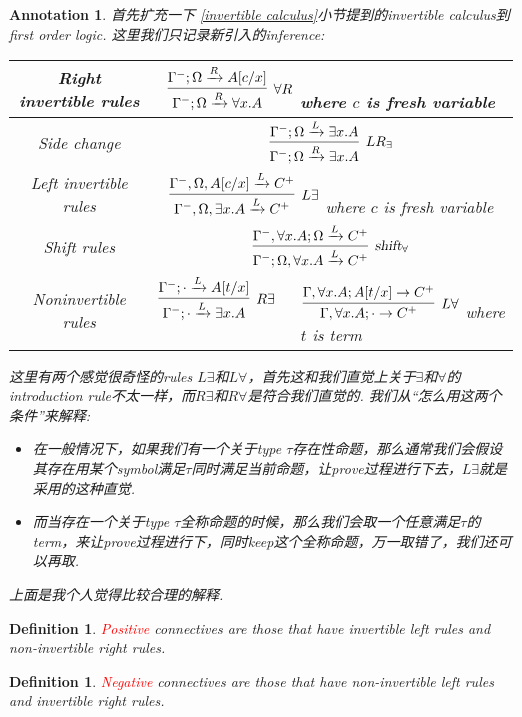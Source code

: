 \documentclass{article}
\theoremstyle{plain}
\newtheorem{definition}[theorem]{Definition}
\newtheorem{annotation}[theorem]{Annotation}
\theoremstyle{nonumberplain}
\newcommand{\redt}[1]{\textcolor{red}{#1}}
\begin{document}
\begin{annotation}
\rm 首先扩充一下 \ref{invertible calculus}小节提到的invertible calculus到first order logic. 这里我们只记录新引入的inference:
\begin{center}
\begin{tabular}{c|c}
Right invertible rules & $\infer[\forall R]{\Gamma^-;\Omega \xrightarrow{R} \forall x.A}{\Gamma^-;\Omega \xrightarrow{R} A[c/x]}$ where $c$ is fresh variable \\
\hline Side change & $\infer[LR_\exists]{\Gamma^-;\Omega \xrightarrow{R} \exists x.A}{\Gamma^-;\Omega \xrightarrow{L} \exists x.A}$ \\
\hline Left invertible rules & $\infer[L \exists]{\Gamma^-,\Omega,\exists x. A \xrightarrow{L} C^+}{\Gamma^-,\Omega,A[c/x] \xrightarrow{L} C^+}$ where $c$ is fresh variable \\
\hline Shift rules & $\infer[\textsl{shift}_\forall]{\Gamma^-; \Omega, \forall x. A \xrightarrow{L} C^+}{\Gamma^-,\forall x. A; \Omega \xrightarrow{L} C^+}$ \\
\hline Noninvertible rules & $\infer[R \exists]{\Gamma^-; \cdot \xrightarrow{L} \exists x.A}{\Gamma^-; \cdot \xrightarrow{L} A[t/x]} \quad\quad \infer[L \forall]{\Gamma, \forall x. A;\cdot \to C^+}{\Gamma, \forall x. A; A[t/x] \to C^+}$ where $t$ is term
\end{tabular}
\end{center}
这里有两个感觉很奇怪的rules $L \exists$和$L \forall$，首先这和我们直觉上关于$\exists$和$\forall$的introduction rule不太一样，而$R \exists$和$R \forall$是符合我们直觉的. 我们从“怎么用这两个条件”来解释:
\begin{itemize}
	\item 在一般情况下，如果我们有一个关于type $\tau$存在性命题，那么通常我们会假设其存在用某个symbol满足$\tau$同时满足当前命题，让prove过程进行下去，$L \exists$就是采用的这种直觉.
	\item 而当存在一个关于type $\tau$全称命题的时候，那么我们会取一个任意满足$\tau$的term，来让prove过程进行下，同时keep这个全称命题，万一取错了，我们还可以再取. 
\end{itemize}
上面是我个人觉得比较合理的解释. 
\end{annotation}

\begin{definition}
\rm \redt{Positive} connectives are those that have invertible left rules and non-invertible right rules. 
\end{definition}

\begin{definition}
\rm \redt{Negative} connectives are those that have non-invertible left rules and invertible right rules.
\end{definition}
\end{document}
